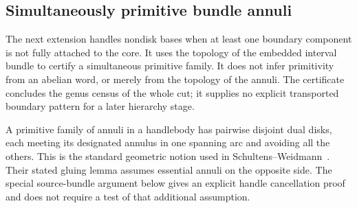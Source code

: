 \subsection{Simultaneously primitive bundle annuli}
\label{marked-cut:primitive-annuli}

The next extension handles nondisk bases when at least one boundary component
is not fully attached to the core. It uses the topology of the embedded
interval bundle to certify a simultaneous primitive family. It does not infer
primitivity from an abelian word, or merely from the topology of the annuli.
The certificate concludes the genus census of the whole cut; it supplies no
explicit transported boundary pattern for a later hierarchy stage.

A primitive family of annuli in a handlebody has pairwise disjoint dual disks,
each meeting its designated annulus in one spanning arc and avoiding all the
others. This is the standard geometric notion used in
Schultens--Weidmann~\cite[Definition~6 and Lemma~2]{schultens-weidmann-primitive}.
Their stated gluing lemma assumes essential annuli on the opposite side.
The special source-bundle argument below gives an explicit handle cancellation
proof and does not require a test of that additional assumption.

